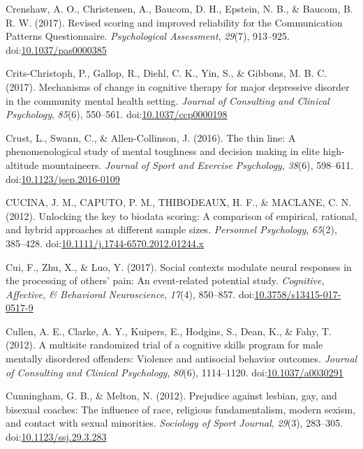 \documentclass[english,man]{apa6}
\begin{document}
\hypertarget{ref-Crenshaw2016}{}
Crenshaw, A. O., Christensen, A., Baucom, D. H., Epstein, N. B., \&
Baucom, B. R. W. (2017). Revised scoring and improved reliability for
the Communication Patterns Questionnaire. \emph{Psychological
Assessment}, \emph{29}(7), 913--925.
doi:\href{https://doi.org/10.1037/pas0000385}{10.1037/pas0000385}

\hypertarget{ref-Crits-Christoph2017a}{}
Crits-Christoph, P., Gallop, R., Diehl, C. K., Yin, S., \& Gibbons, M.
B. C. (2017). Mechanisms of change in cognitive therapy for major
depressive disorder in the community mental health setting.
\emph{Journal of Consulting and Clinical Psychology}, \emph{85}(6),
550--561.
doi:\href{https://doi.org/10.1037/ccp0000198}{10.1037/ccp0000198}

\hypertarget{ref-Crust2016}{}
Crust, L., Swann, C., \& Allen-Collinson, J. (2016). The thin line: A
phenomenological study of mental toughness and decision making in elite
high-altitude mountaineers. \emph{Journal of Sport and Exercise
Psychology}, \emph{38}(6), 598--611.
doi:\href{https://doi.org/10.1123/jsep.2016-0109}{10.1123/jsep.2016-0109}

\hypertarget{ref-Cucina2012}{}
CUCINA, J. M., CAPUTO, P. M., THIBODEAUX, H. F., \& MACLANE, C. N.
(2012). Unlocking the key to biodata scoring: A comparison of empirical,
rational, and hybrid approaches at different sample sizes.
\emph{Personnel Psychology}, \emph{65}(2), 385--428.
doi:\href{https://doi.org/10.1111/j.1744-6570.2012.01244.x}{10.1111/j.1744-6570.2012.01244.x}

\hypertarget{ref-Cui2017}{}
Cui, F., Zhu, X., \& Luo, Y. (2017). Social contexts modulate neural
responses in the processing of others' pain: An event-related potential
study. \emph{Cognitive, Affective, \& Behavioral Neuroscience},
\emph{17}(4), 850--857.
doi:\href{https://doi.org/10.3758/s13415-017-0517-9}{10.3758/s13415-017-0517-9}

\hypertarget{ref-Cullen2012}{}
Cullen, A. E., Clarke, A. Y., Kuipers, E., Hodgins, S., Dean, K., \&
Fahy, T. (2012). A multisite randomized trial of a cognitive skills
program for male mentally disordered offenders: Violence and antisocial
behavior outcomes. \emph{Journal of Consulting and Clinical Psychology},
\emph{80}(6), 1114--1120.
doi:\href{https://doi.org/10.1037/a0030291}{10.1037/a0030291}

\hypertarget{ref-Cunningham2012}{}
Cunningham, G. B., \& Melton, N. (2012). Prejudice against lesbian, gay,
and bisexual coaches: The influence of race, religious fundamentalism,
modern sexism, and contact with sexual minorities. \emph{Sociology of
Sport Journal}, \emph{29}(3), 283--305.
doi:\href{https://doi.org/10.1123/ssj.29.3.283}{10.1123/ssj.29.3.283}
\end{document}
